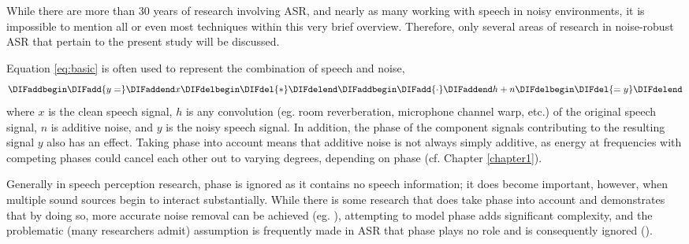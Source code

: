 While there are more than 30 years of research involving ASR, and nearly as many working with speech in noisy environments, it is impossible to mention all or even most techniques within this very brief overview.  Therefore, %
 only several areas of research in noise-robust ASR that pertain to the present study will be discussed.

Equation \ref{eq:basic} is often used to represent the combination of speech and noise,
\begin{equation}\label{eq:basic}
\DIFaddbegin \DIFadd{y = }\DIFaddend x \DIFdelbegin \DIFdel{* }\DIFdelend \DIFaddbegin \DIFadd{\cdot }\DIFaddend h + n
\DIFdelbegin \DIFdel{= y
}\DIFdelend \end{equation}
where $x$ is the clean speech signal, $h$ is any convolution (eg. room reverberation, microphone channel warp, etc.) of the original speech signal, $n$ is additive noise, and $y$ is the noisy speech signal.  In addition, the phase of the component signals contributing to the resulting signal $y$ also has an effect.  Taking phase into account means that additive noise is not always simply additive, as energy at frequencies with competing phases could cancel each other out to varying degrees, depending on phase (cf. Chapter \ref{chapter1}).  

Generally in speech perception research, phase is ignored as it contains no speech information; it does become important, however, when multiple sound sources begin to interact substantially. While there is some research that does take phase into account and demonstrates that by doing so, more accurate noise removal can be achieved (eg. \cite{deng:04,leutnant:09}), attempting to model phase adds significant complexity, and the problematic (many researchers admit) assumption is frequently made in ASR that phase plays no role and is consequently ignored (\cite{li:14}).  

